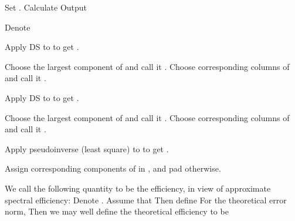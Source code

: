 {
\I Set .
\I Calculate
\I Output 
}
{
\I Denote

\I Apply DS to  to get .

\I Choose the  largest component of  and call it .
Choose corresponding columns of  and call it .
}
{
\I Apply DS to  to get .

\I Choose the  largest component of  and call it .
Choose corresponding columns of  and call it .

\I Apply pseudoinverse (least square) to  to get .

\I Assign corresponding components of  in , and pad  otherwise.
}
{
\I We call the following quantity  to be the efficiency, in view of approximate spectral efficiency:
\I Denote .
Assume that
\I Then define
}
{
\I For the theoretical error norm,
\I Then we may well define the theoretical efficiency to be
}
